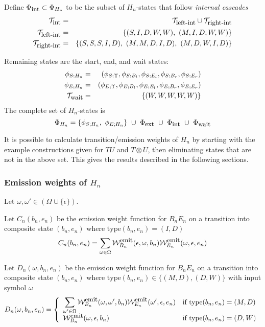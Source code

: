 \documentclass{article}
\newcommand\gappedalphabet[1]{(\Omega_{#1} \cup \{\epsilon\})}
\newcommand\compose{}
\newcommand\fork{\otimes}
\newcommand\idfork{\Upsilon}
\newcommand\States{\Phi}
\newcommand\statesof[1]{\States_{#1}}
\newcommand\startstateof[1]{\phi_{S;#1}}
\newcommand\laststateof[1]{\phi_{E;#1}}
\newcommand\weight{{\cal W}}
\newcommand\weightfunof[1]{\weight_{#1}}
\newcommand\emitweightfun[1]{\weightfunof{#1}^{\mbox{\small emit}}}
\newcommand\statetype{\mbox{type}}
\newcommand\typeset[1]{{\cal T}_{\mbox{\small #1}}}
\newcommand\stateset[1]{\statesof{\mbox{\small #1}}}
\newcommand\externalsuffix{ext}
\newcommand\internalsuffix{int}
\newcommand\leftsuffix{left-int}
\newcommand\rightsuffix{right-int}
\newcommand\waitsuffix{wait}
\newcommand\externalcascades{\stateset{\externalsuffix}}
\newcommand\internalcascades{\stateset{\internalsuffix}}
\newcommand\waitstates{\stateset{\waitsuffix}}
\newcommand\internaltypes{\typeset{\internalsuffix}}
\newcommand\lefttypes{\typeset{\leftsuffix}}
\newcommand\righttypes{\typeset{\rightsuffix}}
\newcommand\waittypes{\typeset{\waitsuffix}}
\begin{document}
Define $\internalcascades \subset \statesof{H_n}$ to be the subset of $H_n$-states that follow {\em internal cascades}
\begin{eqnarray*}
\internaltypes & = & \lefttypes \cup \righttypes \\
\lefttypes & = & \{ (S,I,D,W,W),\ (M,I,D,W,W) \} \\
\righttypes & =  & \{ (S,S,S,I,D),\ (M,M,D,I,D),\ (M,D,W,I,D) \}
\end{eqnarray*}

Remaining states are the start, end, and wait states:
\begin{eqnarray*}
\startstateof{H_n} & = & (\startstateof{\idfork},\startstateof{B_l},\startstateof{E_l},\startstateof{B_r},\startstateof{E_r}) \\
\laststateof{H_n} & = & (\laststateof{\idfork},\laststateof{B_l},\laststateof{E_l},\laststateof{B_r},\laststateof{E_r}) \\
\waittypes & = & \{ (W,W,W,W,W) \}
\end{eqnarray*}
The complete set of $H_n$-states is
\[
\statesof{H_n} = \{ \startstateof{H_n},\ \laststateof{H_n} \}\ \cup\ \externalcascades\ \cup\ \internalcascades\ \cup\ \waitstates
\]

It is possible to calculate transition/emission weights of $H_n$
by starting with the example constructions given for $T \compose U$ and $T \fork U$,
then eliminating states that are not in the above set.
This gives the results described in the following sections.

\subsubsection{Emission weights of $H_n$}

Let $\omega,\omega' \in \gappedalphabet{}$.

Let $C_n(b_n,e_n)$ be the emission weight function for $B_n \compose E_n$ on a transition into composite state $(b_n,e_n)$ where $\statetype(b_n,e_n)=(I,D)$
\[
C_n(b_n,e_n) = \sum_{\omega \in \Omega} \emitweightfun{B_n}(\epsilon,\omega,b_n) \emitweightfun{E_n}(\omega,\epsilon,e_n)
\]

Let $D_n(\omega,b_n,e_n)$ be the emission weight function for $B_n \compose E_n$ on a transition into composite state $(b_n,e_n)$
 where $\statetype(b_n,e_n) \in \{(M,D),(D,W)\}$ with input symbol $\omega$ 
\[
D_n(\omega,b_n,e_n) = \left\{
\begin{array}{ll}
\displaystyle
\sum_{\omega' \in \Omega} \emitweightfun{B_n}(\omega,\omega',b_n) \emitweightfun{E_n}(\omega',\epsilon,e_n)
 & \mbox{if $\statetype(b_n,e_n)=(M,D)$} \\
\emitweightfun{B_n}(\omega,\epsilon,b_n)
 & \mbox{if $\statetype(b_n,e_n)=(D,W)$}
\end{array}
\right.
\]
\end{document}
